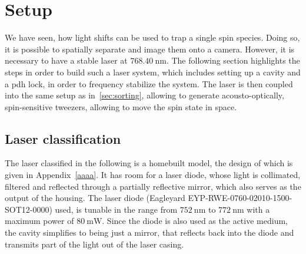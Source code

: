 \begin{figure}[t]%
\end{figure}

\section{Setup}

We have seen, how light shifts can be used to trap a single spin species. Doing so, it is possible to spatially separate and image them onto a camera. However, it is necessary to have a stable laser at $\SI{768.40}{\nano\meter}$. The following section highlights the steps in order to build such a laser system, which includes setting up a cavity and a \ac{pdh} lock, in order to frequency stabilize the system. The laser is then coupled into the same setup as in~\ref{sec:sorting}, allowing to generate acousto-optically, spin-sensitive tweezers, allowing to move the spin state in space.

\subsection{Laser classification}

The laser classified in the following is a homebuilt model, the design of which is given in Appendix~\ref{aaaa}. It has room for a laser diode, whose light is collimated, filtered and reflected through a partially reflective mirror, which also serves as the output of the housing.
The laser diode (Eagleyard EYP-RWE-0760-02010-1500-SOT12-0000) used, is tunable in the range from $\SI{752}{\nano\meter}$ to $\SI{772}{\nano\meter}$ with a maximum power of $\SI{80}{\milli\watt}$. Since the diode is also used as the active medium, the cavity simplifies to being just a mirror, that reflects back into the diode and transmits part of the light out of the laser casing.

